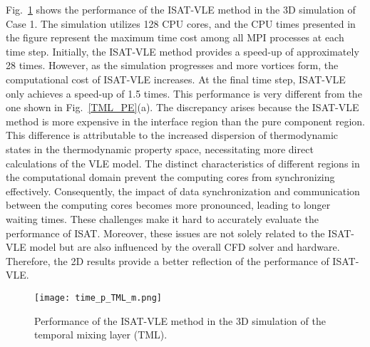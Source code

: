Fig.~\ref{TML_3D_performace} shows the performance of the ISAT-VLE method in the 3D simulation of Case 1. The simulation utilizes 128 CPU cores, and the CPU times presented in the figure represent the maximum time cost among all MPI processes at each time step. Initially, the ISAT-VLE method provides a speed-up of approximately 28 times. However, as the simulation progresses and more vortices form, the computational cost of ISAT-VLE increases. At the final time step, ISAT-VLE only achieves a speed-up of 1.5 times. This performance is very different from the one shown in Fig.~\ref{TML_PE}(a). The discrepancy arises because the ISAT-VLE method is more expensive in the interface region than the pure component region. This difference is attributable to the increased dispersion of thermodynamic states in the thermodynamic property space, necessitating more direct calculations of the VLE model. The distinct characteristics of different regions in the computational domain prevent the computing cores from synchronizing effectively. Consequently, the impact of data synchronization and communication between the computing cores becomes more pronounced, leading to longer waiting times. These challenges make it hard to accurately evaluate the performance of ISAT. Moreover, these issues are not solely related to the ISAT-VLE model but are also influenced by the overall CFD solver and hardware. Therefore, the 2D results provide a better reflection of the performance of ISAT-VLE.



\begin{figure}[htbp]
\centering
\texttt{[image: time\_p\_TML\_m.png]}
\caption{Performance of the ISAT-VLE method in the 3D simulation of the temporal mixing layer (TML).}
\label{TML_3D_performace} 
\end{figure}




